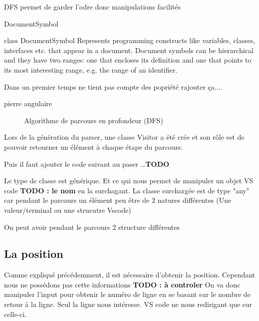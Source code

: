 \documentclass[
    iict, %
    il, %
]{heig-tb}
\begin{document}
DFS permet de garder l'odre donc manipulations facilités

DocumentSymbol

class DocumentSymbol
Represents programming constructs like variables, classes, interfaces etc. that appear in a document. 
Document symbols can be hierarchical and they have two ranges: one that encloses its definition and one
that points to its most interesting range, e.g. the range of an identifier.


Dans un premier temps ne tient pas compte des popriété
rajouter ça....

pierre angulaire

\begin{figure}[!h]
    \begin{center}
    \end{center}
    \caption[Algorithme de parcours en profondeur (DFS)]{\label{ast} Algorithme de parcours en profondeur (DFS)}
\end{figure}

Lors de la génération du parser, une classe Visitor a été crée et son rôle est de pouvoir retourner un élément à chaque étape du parcours.

Puis il faut ajouter le code suivant au paser \dots \textbf{TODO}

Le type de classe est générique. Et ce qui nous permet de manipuler un objet VS code \textbf{TODO : le nom} en la surchagant.
La classe surchargée est de type "any" car pendant le parcours un élément peu être de 2 natures différentes (Une valeur/terminal ou une strucutre Vscode)


On peut avoir pendant le parcours 2 structure différentes

\subsection{La position}

Comme expliqué précédemment, il est nécessaire d'obtenir la position. Cependant nous ne possédons pas cette informations \textbf{TODO : à controler}
On va donc manipuler l'input pour obtenir le numéro de ligne en se basant sur le nombre de retour à la ligne.
Seul la ligne nous intéresse. VS code ne nous redirigant que sur celle-ci.
\end{document}
